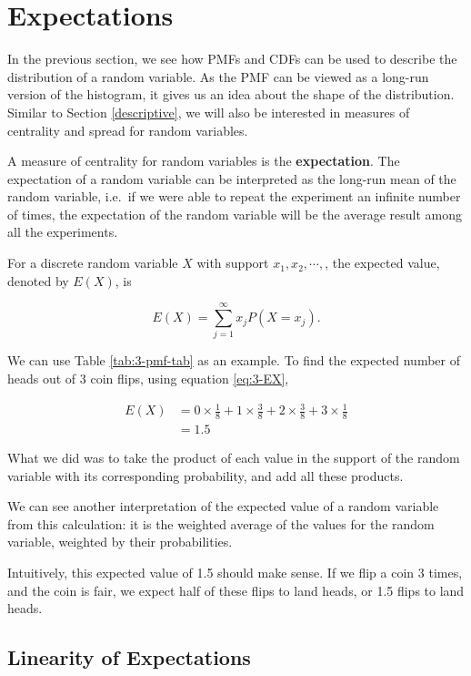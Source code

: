 \documentclass[
]{book}
\begin{document}
\section{Expectations}\label{expectations}

In the previous section, we see how PMFs and CDFs can be used to describe the distribution of a random variable. As the PMF can be viewed as a long-run version of the histogram, it gives us an idea about the shape of the distribution. Similar to Section \ref{descriptive}, we will also be interested in measures of centrality and spread for random variables.

A measure of centrality for random variables is the \textbf{expectation}. The expectation of a random variable can be interpreted as the long-run mean of the random variable, i.e.~if we were able to repeat the experiment an infinite number of times, the expectation of the random variable will be the average result among all the experiments.

For a discrete random variable \(X\) with support \(x_1, x_2, \cdots,\), the expected value, denoted by \(E(X)\), is

\begin{equation} 
E(X) = \sum_{j=1}^{\infty} x_j P(X=x_j).
\label{eq:3-EX}
\end{equation}

We can use Table \ref{tab:3-pmf-tab} as an example. To find the expected number of heads out of 3 coin flips, using equation \eqref{eq:3-EX},

\[
\begin{split}
E(X) &= 0 \times \frac{1}{8} + 1 \times \frac{3}{8} + 2 \times \frac{3}{8} + 3 \times \frac{1}{8}\\
       &= 1.5
\end{split}
\]

What we did was to take the product of each value in the support of the random variable with its corresponding probability, and add all these products.

We can see another interpretation of the expected value of a random variable from this calculation: it is the weighted average of the values for the random variable, weighted by their probabilities.

Intuitively, this expected value of 1.5 should make sense. If we flip a coin 3 times, and the coin is fair, we expect half of these flips to land heads, or 1.5 flips to land heads.

\subsection{Linearity of Expectations}\label{linearity-of-expectations}
\end{document}

